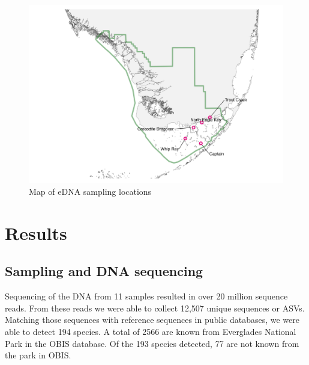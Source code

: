 \documentclass[10pt]{article}
\begin{document}
\begin{figure}[h]
\centering
\includegraphics[width=\textwidth]{map}
\caption{Map of eDNA sampling locations}
\end{figure}

\section*{Results}
\subsection*{Sampling and DNA sequencing}

\begin{multicols}{2}
Sequencing of the DNA from 11 samples resulted in over 20 million sequence reads. From these reads we were able to collect 12,507 unique sequences or ASVs. Matching those sequences with reference sequences in public databases, we were able to detect 194 species. A total of 2566 are known from Everglades National Park in the OBIS database. Of the 193 species detected, 77 are not known from the park in OBIS.
\end{multicols}









\clearpage
\end{document}
